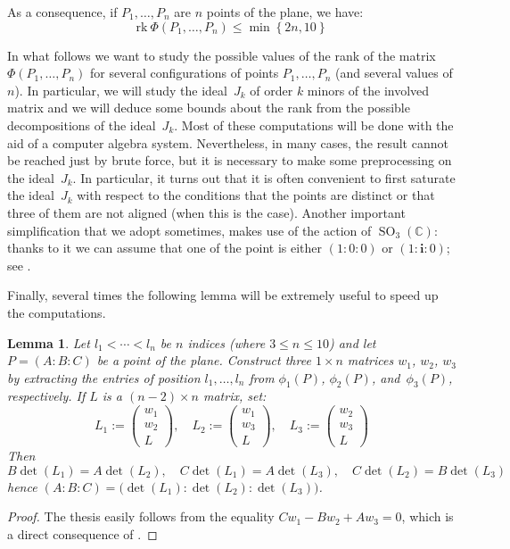 \documentclass[11pt, a4paper, reqno, captions=tableheading,bibliography=totoc]{scrartcl}
\theoremstyle{plain}
\newtheorem{lemma}{Lemma}[section]
\theoremstyle{definition}
\newcommand{\C}{\mathbb{C}}
\newcommand{\SO}{\operatorname{SO}}
\newcommand{\iii}{\textbf{i}}
\begin{document}
As a consequence, if $P_1, \dots, P_n$ are $n$ points of the plane, we have:
\begin{equation}
\label{bound_rank}
\text{rk} \  \Phi(P_1, \dots, P_n) \leq \min \left\{2n, 10 \right\}
\end{equation}

In what follows we want to study the possible values of the rank of the matrix
$\Phi(P_1, \dots, P_n)$ for several configurations of points $P_1, \dots, P_n$
(and several values of $n$).
In particular, we will study the ideal~$J_k$ of order $k$ minors of the
involved matrix and we will deduce some bounds about the rank from the possible
decompositions of the ideal~$J_k$. Most of these computations will be done
with the aid of a computer algebra system. Nevertheless, in many cases,
the result cannot be reached just by brute force, but it is necessary to
make some preprocessing on the ideal~$J_k$. In particular, it turns out that
it is often convenient to first saturate the ideal~$J_k$ with respect to
the conditions that the
points are distinct or that three of them are not aligned (when this is the
case). Another important simplification that we adopt sometimes, makes use
of the action of $\SO_3(\C)$: thanks to it we can assume that one of
the point is either $(1: 0: 0)$ or $(1: \iii: 0)$; see .

Finally, several times the following lemma will be extremely useful
to speed up the computations.

\begin{lemma}
\label{lemma:minors}
Let $l_1 < \cdots <l_n$ be $n$ indices (where $3 \leq n \leq 10$) and let $P = (A: B: C)$ be a point of the plane.
Construct three $1 \times n$ matrices $w_1$, $w_2$, $w_3$ by extracting the entries of position $l_1, \dotsc, l_n$ from $\phi_1(P)$, $\phi_2(P)$, and~$\phi_3(P)$, respectively. If $L$ is a $(n-2) \times n$ matrix, set:
  \[
  L_1 := \left(\begin{array}{c}w_1 \\ w_2 \\ L\end{array}  \right), \quad
  L_2 := \left(\begin{array}{c}w_1 \\ w_3 \\ L\end{array}  \right), \quad
  L_3 := \left(\begin{array}{c}w_2 \\ w_3 \\ L\end{array}  \right)
  \]
  Then
  \[
  B \det(L_1) = A \det(L_2), \quad
  C \det(L_1) = A \det(L_3), \quad
  C \det(L_2) = B \det(L_3)
  \]
  hence $(A: B: C) = \bigl( \det(L_1): \det(L_2): \det(L_3) \bigr)$.
\end{lemma}
\begin{proof}
  The thesis easily follows from the equality $C w_1 - B w_2 + A w_3 = 0$, which is a direct consequence of .
\end{proof}
\end{document}

